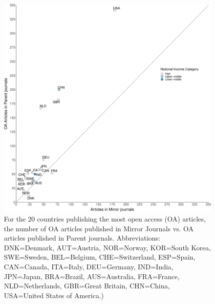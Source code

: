 \documentclass[
  english,
  man]{apa6}
\begin{document}
\begin{figure}

{\centering \includegraphics{Smith_etal_QSS_files/figure-latex/Fig7-1} 

}

\caption{For the 20 countries publishing the most open access (OA) articles, the number of OA articles published in Mirror Journals vs. OA articles published in Parent journals. Abbreviations: DNK=Denmark, AUT=Austria, NOR=Norway, KOR=South Korea, SWE=Sweden, BEL=Belgium, CHE=Switzerland, ESP=Spain, CAN=Canada, ITA=Italy, DEU=Germany, IND=India, JPN=Japan, BRA=Brazil, AUS=Australia, FRA=France, NLD=Netherlands, GBR=Great Britain, CHN=China, USA=United States of America.)}\label{fig:Fig7}
\end{figure}
\end{document}
